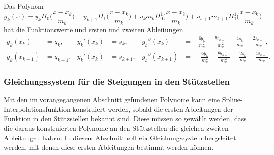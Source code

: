 \begin{satz}
\label{buch:nichtdiff:splines:satz:polynom}
Das Polynom
\[
y_k(x)
=
y_k
H_0\biggl(\frac{x-x_k}{m_k}\biggr)
+
y_{k+1}
H_1\biggl(\frac{x-x_k}{m_k}\biggr)
+
s_k
m_k
H_0^1\biggl(\frac{x-x_k}{m_k}\biggr)
+
s_{k+1}
m_{k+1}
H_1^1\biggl(\frac{x-x_k}{m_k}\biggr)
\]
hat die Funktionswerte und ersten und zweiten Ableitungen
\begin{align*}
y_k(x_k)       &= y_k,
&
y_k'(x_k)      &= s_k,
&
y_k''(x_k)     &=
-\frac{6y_k}{m_k^2} + \frac{6y_{k+1}}{m_k^2}
-
\frac{4s_k}{m_k} - \frac{2s_{k+1}}{m_k},
\\
y_k(x_{k+1})   &= y_{k+1},
&
y_k'(x_k)      &= s_{k+1},
&
y_k''(x_{k+1}) &=
\phantom{-}\frac{6y_k}{m_k^2} - \frac{6y_{k+1}}{m_k^2}
+
\frac{2s_k}{m_k} + \frac{4s_{k+1}}{m_k}.
\end{align*}
\end{satz}

%
%
\subsubsection{Gleichungssystem für die Steigungen in den Stützstellen}
Mit den im vorangegangenen Abschnitt gefundenen Polynome kann eine
Spline-Interpolationsfunktion konstruiert werden, sobald die ersten
Ableitungen der Funktion in den Stützstellen bekannt sind.
Diese müssen so gewählt werden, dass die daraus konstruierten
Polynome an den Stützstellen die gleichen zweiten Ableitungen haben.
In diesem Abschnitt soll ein Gleichungssystem hergeleitet werden, mit
denen diese ersten Ableitungen bestimmt werden können.

